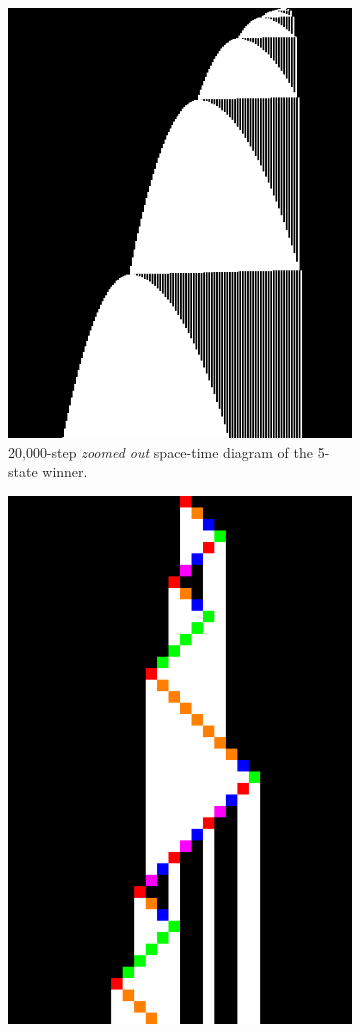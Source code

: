 \documentclass[a4paper,british]{article}
\theoremstyle{definition} %
\numberwithin{equation}{section}
\theoremstyle{definition} %
\begin{document}
\begin{figure}[h!]
\begin{subfigure}[t]{0.45\textwidth}
        \vspace{10pt} %
        \includegraphics[width=0.7\linewidth]{figures/space-time-diagrams/bb5_20k.png} %
        \caption{20,000-step \textit{zoomed out} space-time diagram of the 5-state winner.}\label{fig:bb5-diagram-zoomout}
    \end{subfigure}
    \hfill
    \begin{subfigure}[t]{0.45\textwidth}
        \centering
        \vspace{10pt} %
        \includegraphics[width=0.7\linewidth]{figures/space-time-diagrams/bb5.pdf}

\end{subfigure}
\end{figure}
\end{document}
